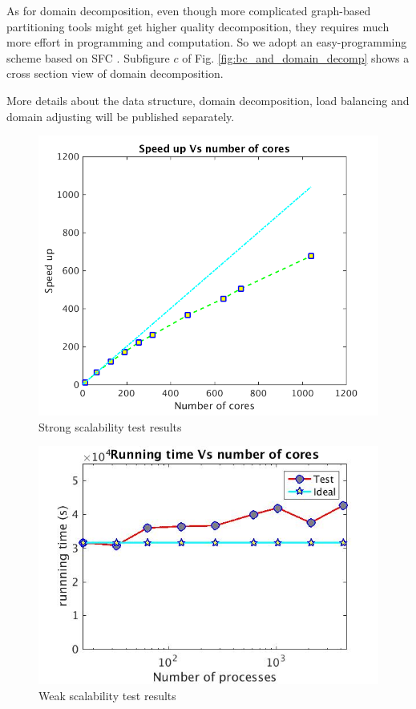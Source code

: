 \documentclass[journal abbreviation, manuscript]{copernicus}
\begin{document}
As for domain decomposition, even though more complicated graph-based partitioning tools \citep {biswas1999experiments} might get higher quality decomposition, they requires much more effort in programming and computation. So we adopt an easy-programming scheme based on SFC \citep {patra1999efficient}. Subfigure $c$ of Fig. \ref{fig:bc_and_domain_decomp} shows a cross section view of domain decomposition.

More details about the data structure, domain decomposition, load balancing and domain adjusting will be published separately.

\begin{figure}[!t]
\centering
\includegraphics[scale=0.35]{strong}
\caption{Strong scalability test results}
\label{fig:strong_scale}
\end{figure}

\begin{figure}[!t]
\centering
\includegraphics[scale=0.35]{weak_scale}
\caption{Weak scalability test results}
\label{fig:weak_scale}
\end{figure}
\end{document}

